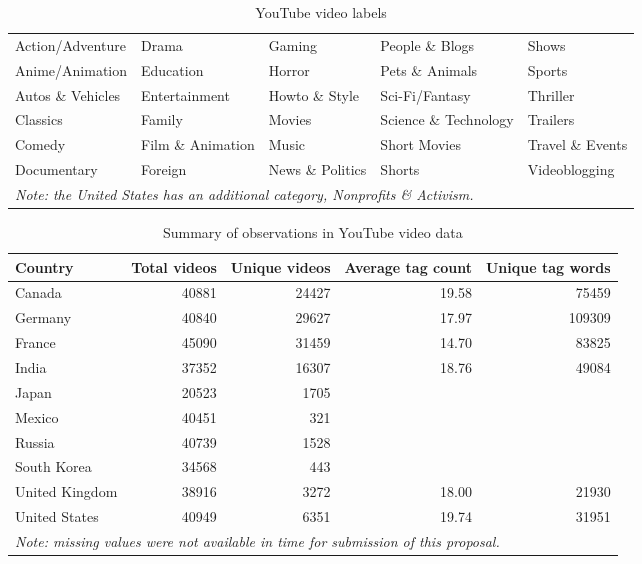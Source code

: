 \documentclass[letterpaper, 12pt]{article}
\begin{document}
\begin{table}[H]
  \caption{YouTube video labels}
  \centering
  \resizebox{\textwidth}{!} {
    \begin{tabular}{lllll}
      \toprule
      Action/Adventure & Drama & Gaming & People \& Blogs & Shows \\
      Anime/Animation & Education & Horror & Pets \& Animals & Sports \\
      Autos \& Vehicles & Entertainment & Howto \& Style & Sci-Fi/Fantasy & Thriller \\
      Classics & Family & Movies & Science \& Technology & Trailers \\
      Comedy & Film \& Animation & Music & Short Movies & Travel \& Events \\
      Documentary & Foreign & News \& Politics & Shorts & Videoblogging \\
      \bottomrule
      \multicolumn{5}{l}{\small\textit{Note: the United States has an additional category, Nonprofits \& Activism.}} \\
    \end{tabular}
  }
  \label{table:categories}
\end{table}

\begin{table}[H]
  \caption{Summary of observations in YouTube video data}
  \centering
  \resizebox{\textwidth}{!} {
    \begin{tabular}{lrrrr}
      \toprule
      Country & Total videos & Unique videos & Average tag count & Unique tag words \\
      \midrule
      Canada & 40881 & 24427 & 19.58 & 75459 \\
      Germany & 40840 & 29627 & 17.97 & 109309 \\
      France & 45090 & 31459 & 14.70 & 83825 \\
      India & 37352 & 16307 & 18.76 & 49084 \\
      Japan & 20523 & 1705 \\
      Mexico & 40451 & 321 \\
      Russia & 40739 & 1528 \\
      South Korea & 34568 & 443 \\
      United Kingdom & 38916 & 3272 & 18.00 & 21930 \\
      United States & 40949 & 6351 & 19.74 & 31951 \\
      \bottomrule
      \multicolumn{5}{l}{\small\textit{Note: missing values were not available in time for submission of this proposal.}} \\
    \end{tabular}
  }
  \label{table:summary_stats}
\end{table}
\end{document}
